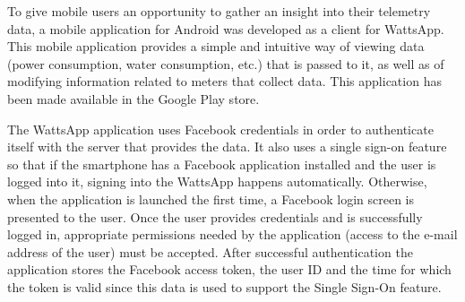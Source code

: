 \documentclass[10pt, conference, compsocconf]{IEEEtran}
\begin{document}
To give mobile users an opportunity to gather an insight into their
telemetry data, a mobile application for Android was developed as a client
for WattsApp. This mobile application provides a simple and intuitive way of 
viewing data (power consumption, water consumption, etc.) that is passed to 
it, as well as of modifying information related to meters that collect data. This
application has been made available in the Google Play store.

The WattsApp application uses Facebook credentials in order to authenticate
itself with the server that provides the data. It also uses a single
sign-on feature so that if the smartphone has a Facebook application
installed and the user is logged into it, signing into the WattsApp
happens automatically. Otherwise, when the application is launched
the first time, a Facebook login screen is presented to the user.
Once the user provides credentials and is successfully logged in,
appropriate permissions needed by the application (access to the e-mail
address of the user) must be accepted. After successful authentication
the application stores the Facebook access token, the user ID and
the time for which the token is valid since this data is used to support
the Single Sign-On feature.
\end{document}
